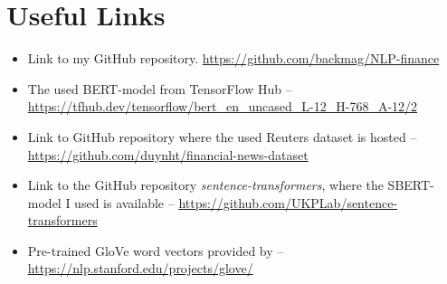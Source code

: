 \chapter{Useful Links}\label{appendix:A}

\begin{itemize}
    \item Link to my GitHub repository. 
    \url{https://github.com/backmag/NLP-finance}
    \item The used BERT-model from TensorFlow Hub --  \url{https://tfhub.dev/tensorflow/bert_en_uncased_L-12_H-768_A-12/2}
    \item Link to GitHub repository where the used Reuters dataset is hosted -- \url{https://github.com/duynht/financial-news-dataset}
    \item Link to the GitHub repository \emph{sentence-transformers}, where the SBERT-model I used is available -- \url{https://github.com/UKPLab/sentence-transformers}
    \item Pre-trained GloVe word vectors provided by \citeauthor{pennington2014glove} --  \\ \url{https://nlp.stanford.edu/projects/glove/}
\end{itemize}